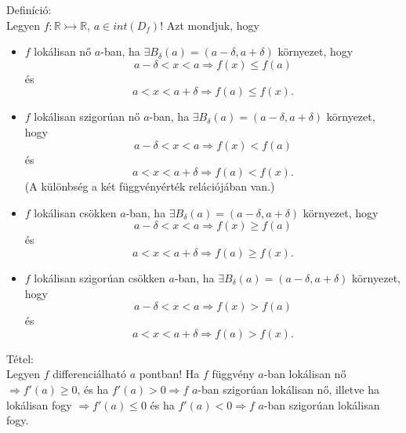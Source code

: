 \documentclass[12pt,a4paper]{scrartcl}
\providecommand{\tightlist}{%
  \setlength{\itemsep}{0pt}\setlength{\parskip}{0pt}}
\newenvironment{definicio}{}{}
\newenvironment{tetel}{}{}
\begin{document}
\begin{definicio}

Definíció:\\
Legyen \(\left. f:{\mathbb{R}}\rightarrowtail{\mathbb{R}} \right.\),
\(a \in {int}\left( D_{f} \right)\)! Azt mondjuk, hogy

\begin{itemize}
\tightlist
\item
  \(f\) lokálisan nő \(a\)-ban, ha
  \(\exists B_{\delta}\left( a \right) = \left( {a - \delta,a + \delta} \right)\)
  környezet, hogy
  \[\left. a - \delta < x < a\Rightarrow f\left( x \right) \leq f\left( a \right) \right.\]
  és
  \[\left. a < x < a + \delta\Rightarrow f\left( a \right) \leq f{\left( x \right).} \right.\]
\item
  \(f\) lokálisan szigorúan nő \(a\)-ban, ha
  \(\exists B_{\delta}\left( a \right) = \left( {a - \delta,a + \delta} \right)\)
  környezet, hogy
  \[\left. a - \delta < x < a\Rightarrow f\left( x \right) < f\left( a \right) \right.\]
  és
  \[\left. a < x < a + \delta\Rightarrow f\left( a \right) < f{\left( x \right).} \right.\]
  (A különbség a két függvényérték relációjában van.)
\item
  \(f\) lokálisan csökken \(a\)-ban, ha
  \(\exists B_{\delta}\left( a \right) = \left( {a - \delta,a + \delta} \right)\)
  környezet, hogy
  \[\left. a - \delta < x < a\Rightarrow f\left( x \right) \geq f\left( a \right) \right.\]
  és
  \[\left. a < x < a + \delta\Rightarrow f\left( a \right) \geq f{\left( x \right).} \right.\]
\item
  \(f\) lokálisan szigorúan csökken \(a\)-ban, ha
  \(\exists B_{\delta}\left( a \right) = \left( {a - \delta,a + \delta} \right)\)
  környezet, hogy
  \[\left. a - \delta < x < a\Rightarrow f\left( x \right) > f\left( a \right) \right.\]
  és
  \[\left. a < x < a + \delta\Rightarrow f\left( a \right) > f{\left( x \right).} \right.\]
\end{itemize}

\end{definicio}

\begin{tetel}

Tétel:\\
Legyen \(f\) differenciálható \(a\) pontban! Ha \(f\) függvény \(a\)-ban
lokálisan nő \(\left. \Rightarrow f'\left( a \right) \geq 0 \right.\),
és ha \(\left. f'\left( a \right) > 0\Rightarrow f \right.\) \(a\)-ban
szigorúan lokálisan nő, illetve ha lokálisan fogy
\(\left. \Rightarrow f'\left( a \right) \leq 0 \right.\) és ha
\(\left. f'\left( a \right) < 0\Rightarrow f \right.\) \(a\)-ban
szigorúan lokálisan fogy.

\end{tetel}
\end{document}
